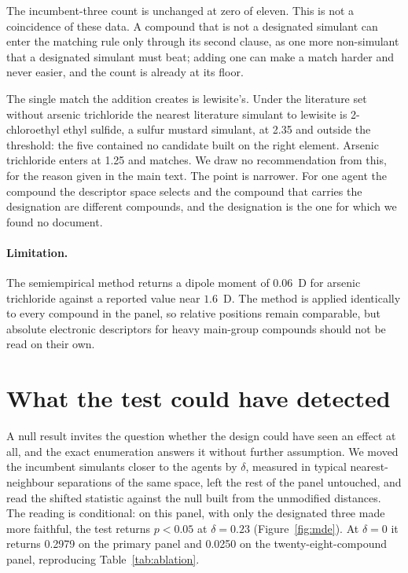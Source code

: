 \documentclass[journal=jacsat,manuscript=suppinfo,margin=1in]{achemso}
\begin{document}
The incumbent-three count is unchanged at zero of eleven. This is not a
coincidence of these data. A compound that is not a designated simulant can
enter the matching rule only through its second clause, as one more
non-simulant that a designated simulant must beat; adding one can make a match
harder and never easier, and the count is already at its floor.

The single match the addition creates is lewisite's. Under the literature set
without arsenic trichloride the nearest literature simulant to lewisite is
2-chloroethyl ethyl sulfide, a sulfur mustard simulant, at 2.35 and outside
the threshold: the five contained no candidate built on the right element.
Arsenic trichloride enters at 1.25 and matches. We draw no recommendation from
this, for the reason given in the main text. The point is narrower. For one
agent the compound the descriptor space selects and the compound that carries
the designation are different compounds, and the designation is the one for
which we found no document.

\paragraph*{Limitation.}
The semiempirical method returns a dipole moment of $0.06$~D for arsenic
trichloride against a reported value near $1.6$~D. The method is applied
identically to every compound in the panel, so relative positions remain
comparable, but absolute electronic descriptors for heavy main-group compounds
should not be read on their own.

\section{What the test could have detected}
\label{res:mde}

A null result invites the question whether the design could have seen an effect
at all, and the exact enumeration answers it without further assumption. We
moved the incumbent simulants closer to the agents by $\delta$, measured in
typical nearest-neighbour separations of the same space, left the rest of the
panel untouched, and read the shifted statistic against the null built from the
unmodified distances. The reading is conditional: on this panel, with only the
designated three made more faithful, the test returns $p<0.05$ at
$\delta = 0.23$ (Figure~\ref{fig:mde}). At $\delta = 0$ it returns 0.2979 on
the primary panel and 0.0250 on the twenty-eight-compound panel, reproducing
Table~\ref{tab:ablation}.
\end{document}
